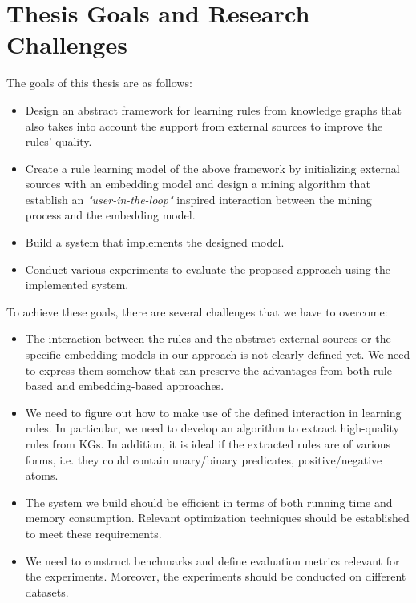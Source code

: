 \section{Thesis Goals and Research Challenges}
The goals of this thesis are as follows:
\begin{itemize}
\item Design an abstract framework for learning rules from knowledge graphs that also takes into account the support from external sources to improve the rules' quality.
\item Create a rule learning model of the above framework by initializing external sources with an embedding model and design a mining algorithm that establish an \textit{"user-in-the-loop"} inspired interaction between the mining process and the embedding model.
\item Build a system that implements the designed model.
\item Conduct various experiments to evaluate the proposed approach using the implemented system.
\end{itemize}
To achieve these goals, there are several challenges that we have to overcome:
\begin{itemize}
\item The interaction between the rules and the abstract external sources or the specific embedding models in our approach is not clearly defined yet. We need to express them somehow that can preserve the advantages from both rule-based and embedding-based approaches.
\item We need to figure out how to make use of the defined interaction in learning rules. In particular, we need to develop an algorithm to extract high-quality rules from KGs. In addition, it is ideal if the extracted rules are of various forms, i.e. they could contain unary/binary predicates, positive/negative atoms.
\item The system we build should be efficient in terms of both running time and memory consumption. Relevant optimization techniques should be established to meet these requirements.
\item We need to construct benchmarks and define evaluation metrics relevant for the experiments. Moreover, the experiments should be conducted on different datasets.
\end{itemize}

